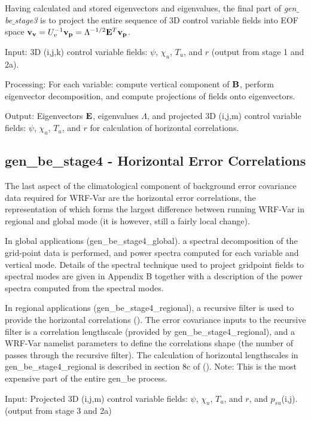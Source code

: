 Having calculated and stored eigenvectors and eigenvalues, the final
part of {\it gen$\_$be$\_$stage3} is to project the entire sequence of
3D control variable fields into EOF space ${\bf v_v}=U_{v}^{-1}{\bf
v_p}=\Lambda^{-1/2}{\bf E}^{T} {\bf v_p}$.

Input: 3D (i,j,k) control variable fields: $\psi$, $\chi_u$,  $T_u$, and $r$ (output from stage 1 and 2a).

Processing: For each variable: compute vertical component of ${\bf B}$, perform eigenvector decomposition, and compute projections of fields onto eigenvectors.

Output: Eigenvectors $\bf E$, eigenvalues $\Lambda$, and projected 3D (i,j,m) control variable fields:  $\psi$, $\chi_u$,  $T_u$, and $r$ for calculation of horizontal correlations.


\subsection{gen\_be\_stage4 - Horizontal Error Correlations}

The last aspect of the climatological component of background error covariance data required for WRF-Var are the horizontal error correlations, the representation of which forms the largest difference between running WRF-Var in regional and global mode (it is however, still a fairly local change).

In global applications (gen\_be\_stage4\_global). a spectral decomposition of the grid-point data is performed, and power spectra computed for each variable and vertical mode. Details of the spectral technique used to project gridpoint fields to spectral modes are given in Appendix B together with a description of the power spectra computed from the spectral modes.

In regional applications (gen\_be\_stage4\_regional), a recursive filter is used to provide the horizontal correlations (\citet{barker04}). The error covariance inputs to the recursive filter is a correlation lengthscale (provided by gen\_be\_stage4\_regional), and a WRF-Var namelist parameters to define the correlations shape (the number of passes through the recursive filter).  The calculation of horizontal lengthscales in gen\_be\_stage4\_regional is described in section 8c of (\citet{barker04}). Note: This is the most expensive part of the entire gen\_be process.

Input: Projected 3D (i,j,m) control variable fields: $\psi$, $\chi_u$,  $T_u$, and $r$, and $p_{su}$(i,j). (output from stage 3 and 2a)

